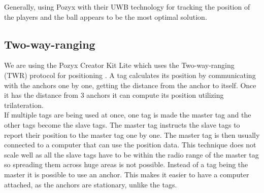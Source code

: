 Generally, using Pozyx with their UWB technology for tracking the position of the players and the ball appears to be the most optimal solution.

\subsection{Two-way-ranging}\label{pozyx:TWR}
We are using the Pozyx Creator Kit Lite which uses the Two-way-ranging (TWR) protocol for positioning \cite{pozyx-Positioning}.
A tag calculates its position by communicating with the anchors one by one, getting the distance from the anchor to itself.
Once it has the distance from 3 anchors it can compute its position utilizing trilateration.
\\
If multiple tags are being used at once, one tag is made the master tag and the other tags become the slave tags.
The master tag instructs the slave tags to report their position to the master tag one by one.
The master tag is then usually connected to a computer that can use the position data.
This technique does not scale well as all the slave tags have to be within the radio range of the master tag so spreading them across huge areas is not possible.
Instead of a tag being the master it is possible to use an anchor.
This makes it easier to have a computer attached, as the anchors are stationary, unlike the tags.
